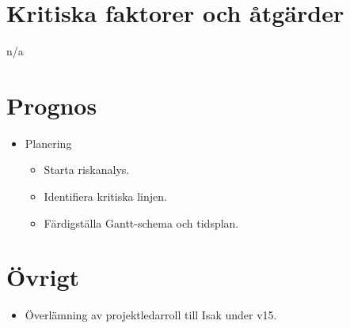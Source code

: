 \section{Kritiska faktorer och åtgärder}
n/a

\section{Prognos}
\begin{itemize}[noitemsep]
    \item Planering
    \begin{itemize}[noitemsep]
        \item Starta riskanalys.
        \item Identifiera kritiska linjen.
        \item Färdigställa Gantt-schema och tidsplan.
    \end{itemize}
\end{itemize}

\section{Övrigt}
\begin{itemize}[noitemsep]
    \item Överlämning av projektledarroll till Isak under v15.
\end{itemize}
